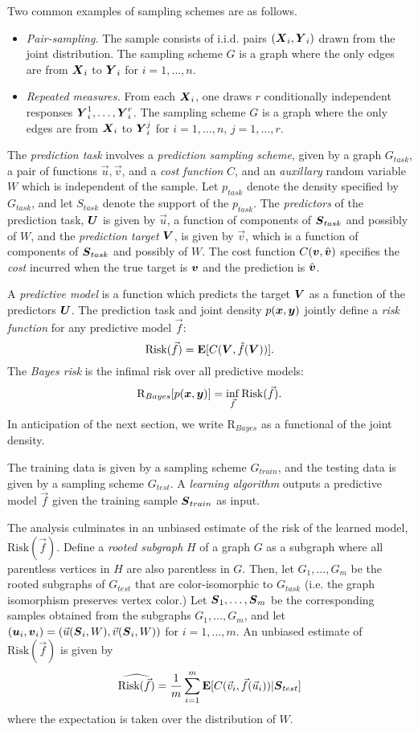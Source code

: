 \documentclass[12pt]{article}
\begin{document}
Two common examples of sampling schemes are as follows.
\begin{itemize}
\item 
\emph{Pair-sampling.}
The sample consists of i.i.d. pairs $(\boldsymbol{X}_i, \boldsymbol{Y}_i)$ drawn from the joint
distribution.  The sampling scheme $G$ is a graph where the
only edges are from $\boldsymbol{X}_i$ to $\boldsymbol{Y}_i$ for $i = 1,\hdots, n$.
\item
\emph{Repeated measures.}
From each $\boldsymbol{X}_i$, one draws $r$ conditionally independent responses
$\boldsymbol{Y}_i^1,\hdots, \boldsymbol{Y}_i^r$.  The sampling scheme $G$ is a graph where
the only edges are from $\boldsymbol{X}_i$ to $\boldsymbol{Y}_i^j$ for $i = 1,\hdots, n$, $j
= 1,\hdots, r$.
\end{itemize}

The \emph{prediction task} involves a \emph{prediction sampling
scheme}, given by a graph $G_{task}$, a pair of functions
$\vec{u}, \vec{v}$, and a \emph{cost function} $C$, and
an \emph{auxillary} random variable $W$ which is independent of the
sample.  Let $p_{task}$ denote the density specified by $G_{task}$,
and let $S_{task}$ denote the support of the $p_{task}$.
The \emph{predictors} of the prediction task, $\boldsymbol{U}$ is given by
$\vec{u}$, a function of components of $\boldsymbol{S}_{task}$ and possibly of
$W$, and the \emph{prediction target} $\boldsymbol{V}$, is given by $\vec{v}$,
which is a function of components of $\boldsymbol{S}_{task}$ and possibly of $W$.
The cost function $C(\boldsymbol{v}, \hat{\boldsymbol{v}})$ specifies the \emph{cost}
incurred when the true target is $\boldsymbol{v}$ and the prediction is
$\hat{\boldsymbol{v}}$.

A \emph{predictive model} is a function which predicts the target
$\boldsymbol{V}$ as a function of the predictors $\boldsymbol{U}$.  The prediction task and
joint density $p(\boldsymbol{x},\boldsymbol{y})$ jointly define a \emph{risk function} for
any predictive model $\vec{f}$:
\[
\text{Risk}(\vec{f}) = \textbf{E}[C(\boldsymbol{V}, \hat{f}(\boldsymbol{V}))].
\]
The \emph{Bayes risk} is the infimal risk over all predictive models:
\[
\text{R}_{Bayes}[p(\boldsymbol{x},\boldsymbol{y})] = \inf_{\vec{f}} \text{Risk}(\vec{f}).
\]
In anticipation of the next section, we write $\text{R}_{Bayes}$ as a
functional of the joint density.

The training data is given by a sampling scheme $G_{train}$, and the
testing data is given by a sampling scheme $G_{test}$.
A \emph{learning algorithm} outputs a predictive model $\vec{f}$ given
the training sample $\boldsymbol{S}_{train}$ as input.

The analysis culminates in an unbiased estimate of the risk of the
learned model, $\text{Risk}(\vec{f})$.  Define a \emph{rooted
subgraph} $H$ of a graph $G$ as a subgraph where all parentless
vertices in $H$ are also parentless in $G$.  Then, let $G_1,\hdots,
G_m$ be the rooted subgraphs of $G_{test}$ that are color-isomorphic
to $G_{task}$ (i.e. the graph isomorphism preserves vertex color.)
Let $\boldsymbol{S}_1,\hdots, \boldsymbol{S}_m$ be the corresponding samples obtained from
the subgraphs $G_1,\hdots, G_m$, and let $(\boldsymbol{u}_i, \boldsymbol{v}_i) =
(\vec{u}(\boldsymbol{S}_i, W), \vec{v}(\boldsymbol{S}_i, W))$ for $i = 1,\hdots, m$.  An unbiased estimate of $\text{Risk}(\vec{f})$ is given by
\[
\widehat{\text{Risk}(\vec{f})} = \frac{1}{m}\sum_{i=1}^m \textbf{E}[C(\vec{v}_i, \vec{f}(\vec{u}_i))|\boldsymbol{S}_{test}]
\]
where the expectation is taken over the distribution of $W$.
\end{document}
